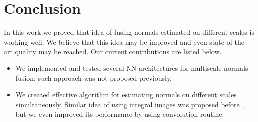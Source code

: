 \chapter{Conclusion}

In this work we proved that idea of fusing normals estimated on different scales is working well. We believe that this idea may be improved and even state-of-the-art quality may be reached. Our current contributions are listed below.
\begin{itemize}
    \item We implemented and tested several NN architectures for multiscale normals fusion; such approach was not proposed previously.
    \item We created effective  algorithm for estimating normals on different scales simultaneously. Similar idea of using integral images was proposed before \cite{adaptive-neighborhood}, but we even improved its performance by using convolution routine.
\end{itemize}